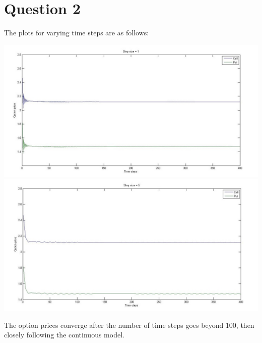 \documentclass[12pt]{article}
\begin{document}
\section{Question 2}
The plots for varying time steps are as follows:\\
  \begin{center}
    \includegraphics[width=7in]{plot1.jpg}
    \includegraphics[width=7in]{plot2.jpg}
  \end{center}
  
  The option prices converge after the number of time steps goes beyond 100, then closely following the continuous model.

\newpage
\end{document}
